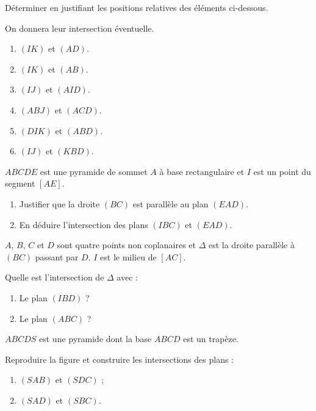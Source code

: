 \begin{colonne*exercice}
\begin{exercice}
  Déterminer en justifiant les positions relatives des éléments
  ci-dessous. 

  On donnera leur intersection éventuelle.
  \begin{enumerate}
  \item $(IK)$ et $(AD)$.
  \item $(IK)$ et $(AB)$.
  \item $(IJ)$ et $(AID)$.
  \item $(ABJ)$ et $(ACD)$.
  \item $(DIK)$ et $(ABD)$.
  \item $(IJ)$ et $(KBD)$.
  \end{enumerate}
\end{exercice}

\begin{exercice}
  $ABCDE$ est une pyramide de sommet $A$ à base rectangulaire et $I$
  est un point du segment $[AE]$.
  \begin{enumerate}
  \item Justifier que la droite $(BC)$ est parallèle au plan $(EAD)$.
  \item En déduire l'intersection des plans $(IBC)$ et $(EAD)$.
  \end{enumerate}
\end{exercice}

\begin{exercice}
  $A$, $B$, $C$ et $D$ sont quatre points non coplanaires et $\Delta$
  est la droite parallèle à $(BC)$ passant par $D$. $I$ est le milieu
  de $[AC]$.

  Quelle est l'intersection de $\Delta$ avec :
  \begin{enumerate}
  \item Le plan $(IBD)$ ?
  \item Le plan $(ABC)$ ?
  \end{enumerate}
\end{exercice}

\pagebreak

\begin{exercice}
  $ABCDS$ est une pyramide dont la base $ABCD$ est un trapèze.

  \begin{center}
    
  \end{center}

  Reproduire la figure et construire les intersections des plans :
  \begin{enumerate}
  \item $(SAB)$ et $(SDC)$ ;
  \item $(SAD)$ et $(SBC)$.
  \end{enumerate}
\end{exercice}
 

\end{colonne*exercice}
